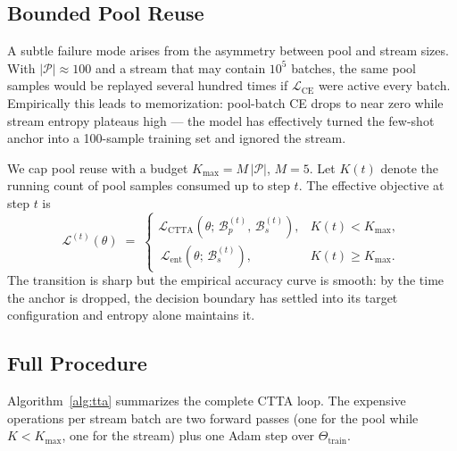 \documentclass[10pt, conference, letterpaper]{IEEEtran}
\begin{document}
\subsection{Bounded Pool Reuse}
\label{sec:poolcap}

A subtle failure mode arises from the asymmetry between pool and stream sizes. With $|\mathcal{P}| \approx 100$ and a stream that may contain $10^5$ batches, the same pool samples would be replayed several hundred times if $\mathcal{L}_{\text{CE}}$ were active every batch. Empirically this leads to memorization: pool-batch CE drops to near zero while stream entropy plateaus high --- the model has effectively turned the few-shot anchor into a 100-sample training set and ignored the stream.

We cap pool reuse with a budget $K_{\max} = M\,|\mathcal{P}|$, $M = 5$. Let $K(t)$ denote the running count of pool samples consumed up to step $t$. The effective objective at step $t$ is
\begin{equation}
\label{eq:tta-eff}
\mathcal{L}^{(t)}(\theta) \;=\;
\begin{cases}
\mathcal{L}_{\text{CTTA}}\!\left(\theta;\, \mathcal{B}_p^{(t)},\, \mathcal{B}_s^{(t)}\right), & K(t) < K_{\max}, \\[4pt]
\, \mathcal{L}_{\text{ent}}\!\left(\theta;\, \mathcal{B}_s^{(t)}\right), & K(t) \geq K_{\max}.
\end{cases}
\end{equation}
The transition is sharp but the empirical accuracy curve is smooth: by the time the anchor is dropped, the decision boundary has settled into its target configuration and entropy alone maintains it.

\subsection{Full Procedure}

Algorithm~\ref{alg:tta} summarizes the complete CTTA loop. The expensive operations per stream batch are two forward passes (one for the pool while $K < K_{\max}$, one for the stream) plus one Adam step over $\Theta_{\text{train}}$.
\end{document}
